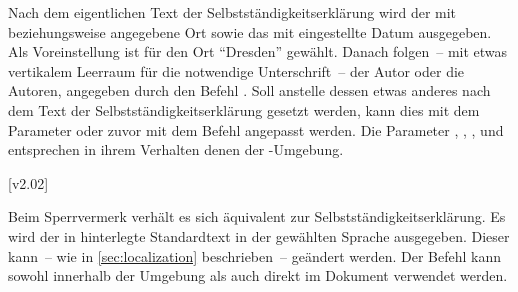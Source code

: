 \begin{DeclareEntity*}{}
\begin{DeclareEntity*}{}
\begin{DeclareEntity*}{}
\begin{Declaration}
\begin{Declaration}
\begin{Declaration}
\begin{Declaration}
\begin{Declaration}
\begin{Declaration}
\begin{Declaration}
\begin{Declaration}
\begin{Declaration}
\begin{Declaration}
Nach dem eigentlichen Text der Selbstständigkeitserklärung wird der mit 
 beziehungsweise  angegebene Ort 
sowie das mit  eingestellte Datum ausgegeben. Als Voreinstellung 
ist für den Ort \enquote{Dresden} gewählt. Danach folgen~-- mit etwas 
vertikalem Leerraum für die notwendige Unterschrift~-- der Autor oder die 
Autoren, angegeben durch den Befehl . Soll anstelle dessen etwas 
anderes nach dem Text der Selbstständigkeitserklärung gesetzt werden, kann dies 
mit dem Parameter  oder zuvor mit dem 
Befehl  angepasst werden. Die Parameter 
, 
, 
, 
 und 
 entsprechen in ihrem Verhalten denen 
der -Umgebung.
\end{Declaration}
\end{Declaration}
\end{Declaration}
\end{Declaration}
\end{Declaration}
\end{Declaration}
\end{Declaration}
\end{Declaration}
\end{Declaration}
\end{Declaration}

\begin{Declaration}
  {}
  [v2.02]
\begin{Declaration}
  {}
\begin{Declaration}
  {}
\begin{Declaration}
  {}
\begin{Declaration}
  {}
\begin{Declaration}
  {}
\begin{Declaration}
  {}
\printdeclarationlist

Beim Sperrvermerk verhält es sich äquivalent zur Selbstständigkeitserklärung.
Es wird der in  hinterlegte Standardtext in der gewählten 
Sprache ausgegeben. Dieser kann~-- wie in \autoref{sec:localization} 
beschrieben~-- geändert werden. Der Befehl  kann sowohl 
innerhalb der Umgebung  als auch direkt im Dokument 
verwendet werden. 


\end{Declaration}
\end{Declaration}
\end{Declaration}
\end{Declaration}
\end{Declaration}
\end{Declaration}
\end{Declaration}
\end{DeclareEntity*}
\end{DeclareEntity*}
\end{DeclareEntity*}
